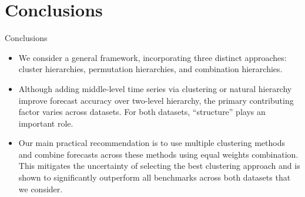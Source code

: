 \documentclass[aspectratio=169]{beamer}
\begin{document}
\section{Conclusions}

\begin{frame}{Conclusions}
	\begin{itemize}
		\item We consider a general framework, incorporating three distinct approaches: cluster hierarchies, permutation hierarchies, and combination hierarchies.
		\item Although adding middle-level time series via clustering or natural hierarchy improve forecast accuracy over two-level hierarchy, {\color{red}the primary contributing factor varies across datasets}. For both datasets, ``structure'' plays an important role.
		\item Our main practical recommendation is to {\color{red}use multiple clustering methods and combine forecasts across these methods using equal weights combination}. This mitigates the uncertainty of selecting the best clustering approach and is shown to significantly outperform all benchmarks across both datasets that we consider.
	\end{itemize}
\end{frame}
\end{document}
